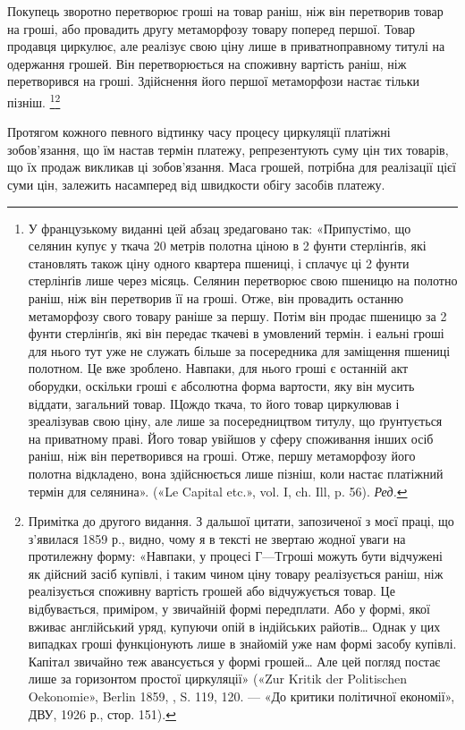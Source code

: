 Покупець зворотно перетворює гроші на товар раніш, ніж він перетворив товар на гроші, або провадить
другу метаморфозу товару поперед першої. Товар продавця циркулює, але реалізує свою ціну лише в
приватноправному титулі на одержання
грошей. Він перетворюється на споживну вартість раніш, ніж перетворився на гроші. Здійснення його
першої метаморфози настає тільки пізніш. \footnote*{У французькому виданні цей абзац зредаговано так: «Припустімо, що селянин купує у ткача 20 метрів
полотна ціною в 2 фунти стерлінґів, які становлять також ціну одного квартера пшениці, і сплачує ці
2 фунти стерлінґів лише через місяць. Селянин перетворює свою пшеницю на полотно раніш, ніж він
перетворив її на гроші. Отже, він провадить останню метаморфозу свого товару раніше за першу. Потім
він продає
пшеницю за 2 фунти стерлінґів, які він передає ткачеві в умовлений термін. і еальні гроші для нього
тут уже не служать більше за посередника для заміщення пшениці полотном. Це вже зроблено. Навпаки,
для нього гроші є останній акт оборудки, оскільки гроші є абсолютна форма вартости, яку він мусить
віддати, загальний товар. ІЦождо ткача, то його товар циркулював і зреалізував свою ціну, але лише
за посередництвом титулу, що ґрунтується на приватному праві. Його товар увійшов у сферу споживання
інших осіб раніш, ніж він перетворився на гроші. Отже, першу метаморфозу його полотна відкладено,
вона здійснюється лише пізніш, коли настає платіжний термін для селянина». («Le Capital etc.», vol.
I, ch. Ill, p. 56). \emph{Ред.}}\footnote{Примітка до другого видання. З дальшої цитати, запозиченої з моєї праці, що з’явилася 1859 р.,
видно, чому я в тексті не звертаю жодної уваги на протилежну форму: «Навпаки, у процесі $Г — Т г$роші
можуть бути відчужені як дійсний засіб купівлі, і таким чином ціну товару реалізується раніш, ніж
реалізується споживну вартість грошей або відчужується товар. Це відбувається, приміром, у звичайній
формі передплати. Або у формі, якої вживає англійський уряд, купуючи опій в індійських райотів\dots{}
Однак у цих випадках гроші функціонують лише в знайомій
уже нам формі засобу купівлі. Капітал звичайно теж авансується у формі грошей\dots{} Але цей погляд
постає лише за горизонтом простої циркуляції» («Zur Kritik der Politischen Oekonomie», Berlin 1859,
, S. 119, 120. — «До критики політичної економії», ДВУ, 1926 р., стор. 151).}

Протягом кожного певного відтинку часу процесу циркуляції платіжні зобов’язання, що їм настав термін
платежу, репрезентують суму цін тих товарів, що їх продаж викликав ці зобов’язання. Маса грошей,
потрібна для реалізації цієї суми цін,
залежить насамперед від швидкости обігу засобів платежу.
\parbreak{}  %
